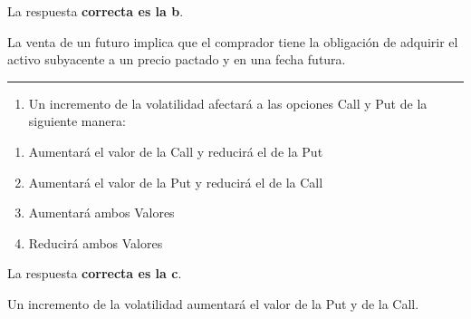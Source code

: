 \documentclass[
  letterpaper,
  DIV=11,
  numbers=noendperiod]{scrreprt}
\providecommand{\tightlist}{%
  \setlength{\itemsep}{0pt}\setlength{\parskip}{0pt}}\usepackage{longtable,booktabs,array}
\begin{document}
\begin{tcolorbox}[enhanced jigsaw, left=2mm, opacityback=0, colback=white, breakable, arc=.35mm, bottomrule=.15mm, rightrule=.15mm, toprule=.15mm, leftrule=.75mm, colframe=quarto-callout-tip-color-frame]
\begin{minipage}[t]{5.5mm}
\textcolor{quarto-callout-tip-color}{\faLightbulb}
\end{minipage}%
\begin{minipage}[t]{\textwidth - 5.5mm}

La respuesta \textbf{correcta es la b}.

La venta de un futuro implica que el comprador tiene la obligación de
adquirir el activo subyacente a un precio pactado y en una fecha futura.

\end{minipage}%
\end{tcolorbox}

\begin{center}\rule{0.5\linewidth}{0.5pt}\end{center}

\begin{enumerate}
\def\labelenumi{\arabic{enumi}.}
\setcounter{enumi}{41}
\tightlist
\item
  Un incremento de la volatilidad afectará a las opciones Call y Put de
  la siguiente manera:
\end{enumerate}

\begin{enumerate}
\def\labelenumi{\alph{enumi})}
\item
  Aumentará el valor de la Call y reducirá el de la Put
\item
  Aumentará el valor de la Put y reducirá el de la Call
\item
  Aumentará ambos Valores
\item
  Reducirá ambos Valores
\end{enumerate}

\begin{tcolorbox}[enhanced jigsaw, left=2mm, opacityback=0, colback=white, breakable, arc=.35mm, bottomrule=.15mm, rightrule=.15mm, toprule=.15mm, leftrule=.75mm, colframe=quarto-callout-tip-color-frame]
\begin{minipage}[t]{5.5mm}
\textcolor{quarto-callout-tip-color}{\faLightbulb}
\end{minipage}%
\begin{minipage}[t]{\textwidth - 5.5mm}

La respuesta \textbf{correcta es la c}.

Un incremento de la volatilidad aumentará el valor de la Put y de la
Call.

\end{minipage}%
\end{tcolorbox}
\end{document}
